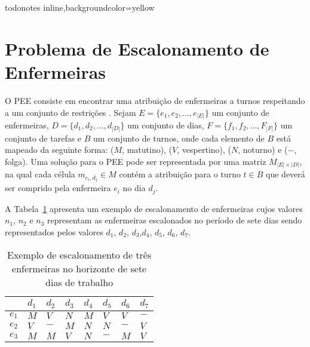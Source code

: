 { }

\presetkeys%
    {todonotes}%
    {inline,backgroundcolor=yellow}{}


\section{Problema de Escalonamento de Enfermeiras}


O \ac{PEE} consiste em encontrar uma atribuição de enfermeiras a turnos respeitando a um conjunto de restrições \cite{ioanis:2015}. Sejam $E = \{e_1, e_2, \ldots, e_{|E|}\}$ um conjunto de enfermeiras, $D = \{d_1, d_2, ..., d_{|D|}\}$ um conjunto de dias,  $F = \{ f_1, f_2, ..., F_{|F|} \}$ um conjunto de tarefas e $B$ um conjunto de turnos, onde cada elemento de $B$ está mapeado da seguinte forma: ($M$, matutino), ($V$, vespertino), ($N$, noturno) e ($-$, folga). Uma solução para o \ac{PEE} pode ser representada por uma matriz $M_{|E|\times |D|}$, na qual cada célula $m_{e_i,d_j} \in M$ contém a atribuição para o turno $t\in B $ que deverá ser comprido pela enfermeira $e_i$ no dia $d_j$.


A Tabela~\ref{enfermeira_dia} apresenta um exemplo de escalonamento de enfermeiras cujos valores $n_1$, $n_2$ e $n_3$ representam as enfermeiras escalonados no período de sete dias sendo representados pelos valores $d_1$, $d_2$, $d_3$,$d_4$, $d_5$, $d_6$, $d_7$.

\begin{table}[ht]
 \centering
\caption{Exemplo de escalonamento de três enfermeiras no horizonte de sete dias de trabalho \label{enfermeira_dia}}
\begin{tabular}{r|l|l|l|l|l|l|l}
  	   & $d_1$ & $d_2$ & $d_3$ & $d_4$ & $d_5$ & $d_6$ & $d_7$ \\ \hline
 $e_1$ & $M$  & $V$  & $N$  & $M$  & $V$  & $V$  & $-$ \\ \hline
 $e_2$ & $V$  & $-$  & $M$  & $N$  & $N$  & $-$  & $V$\\ \hline
 $e_3$ & $M$  & $M$  & $V$  & $N$  & $-$  & $M$  & $V$
\end{tabular}
\end{table}

